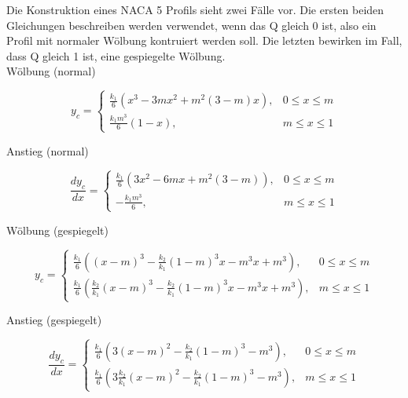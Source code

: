 \documentclass[12pt]{scrreprt}
\begin{document}
Die Konstruktion eines NACA 5 Profils sieht zwei F\"alle vor. Die ersten beiden Gleichungen beschreiben werden verwendet, wenn das Q gleich 0 ist, also ein Profil mit normaler W\"olbung kontruiert werden soll. Die letzten bewirken im Fall, dass Q gleich 1 ist, eine gespiegelte W\"olbung.\\

W\"olbung (normal)

\begin{equation}
     y_c = \left\{ \begin{array}{ll}
			\frac{k_1}{6}(x^3 - 3mx^2 + m^2 (3-m)x), & 0 \leq x \le m \\[0.5cm]
         		\frac{k_1m^3}{6}(1-x), & m \leq x \leq 1
         	\end{array}\right.
\end{equation}

Anstieg (normal)

\begin{equation}
     \frac{dy_c}{dx} = \left\{ \begin{array}{ll}
					\frac{k_1}{6}(3x^2 - 6mx + m^2 (3-m)), & 0 \leq x \le m \\[0.5cm]
         				-\frac{k_1m^3}{6}, & m \leq x \leq 1
         			\end{array}\right.
\end{equation}

W\"olbung (gespiegelt)

\begin{equation}
     y_c = \left\{ \begin{array}{ll}
			\frac{k_1}{6}\left((x-m)^3 - \frac{k_2}{k_1} (1-m)^3x-m^3x+m^3\right), & 0 \leq x \le m \\[0.5cm]
         		\frac{k_1}{6}\left(\frac{k_2}{k_1}(x-m)^3 - \frac{k_2}{k_1} (1-m)^3 x -m^3x + m^3\right), & m \leq x \leq 1
         	\end{array}\right.
\end{equation}

Anstieg (gespiegelt)

\begin{equation}
     \frac{dy_c}{dx} = \left\{ \begin{array}{ll}
					\frac{k_1}{6}\left(3(x-m)^2 - \frac{k_2}{k_1} (1-m)^3 - m^3\right), & 0 \leq x \le m \\[0.5cm]
         				\frac{k_1}{6}\left(3 \frac{k_2}{k_1} (x-m)^2 - \frac{k_2}{k_1}(1-m)^3 -m^3\right), & m \leq x \leq 1
         			\end{array}\right.
\end{equation}
\end{document}
